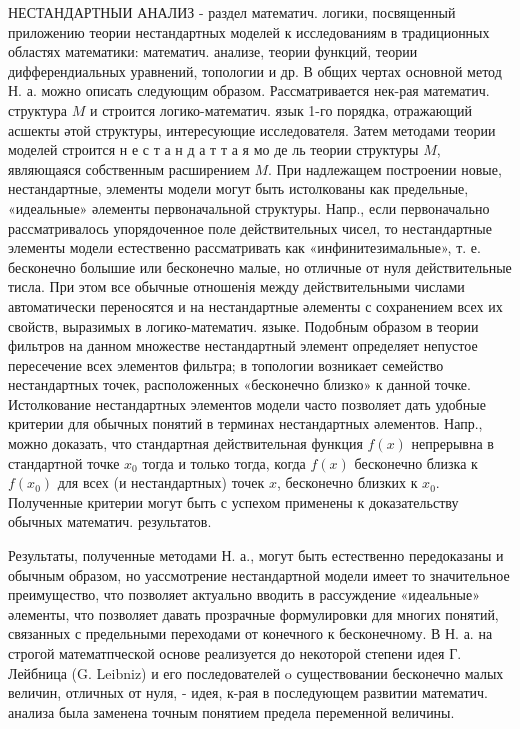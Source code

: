 \documentclass[10pt]{article}
\begin{document}
НЕСТАНДАРТНЫИ АНАЛИЗ - раздел математич. логики, посвященный приложению теории нестандартных моделей к исследованиям в традиционных областях математики: математич. анализе, теории функций, теории дифферендиальных уравнений, топологии и др. В общих чертах основной метод Н. а. можно описать следующим образом. Рассматривается нек-рая математич. структура $M$ и строится логико-математич. язык 1-го порядка, отражающий асшекты әтой структуры, интересующие исследователя. Затем методами теории моделей строится н е с т а н д а т т а я мо де ль теории структуры $M$, являющаяся собственным расширением $M$. При надлежащем построении новые, нестандартные, элементы модели могут быть истолкованы как предельные, «идеальные» әлементы первоначальной структуры. Напр., если первоначально рассматривалось упорядоченное поле действительных чисел, то нестандартные элементы модели естественно рассматривать как «инфинитезимальные», т. е. бесконечно болышие или бесконечно малые, но отличные от нуля действительные тисла. При этом все обычные отношенія между действительными числами автоматически переносятся и на нестандартные әлементы с сохранением всех их свойств, выразимых в логико-математич. языке. Подобным образом в теории фильтров на данном множестве нестандартный элемент определяет непустое пересечение всех элементов фильтра; в топологии возникает семейство нестандартных точек, расположенных «бесконечно близко» к данной точке. Истолкование нестандартных элементов модели часто позволяет дать удобные критерии для обычных понятий в терминах нестандартных әлементов. Напр., можно доказать, что стандартная действительная функция $f(x)$ непрерывна в стандартной точке $x_{0}$ тогда и только тогда, когда $f(x)$ бесконечно близка к $f\left(x_{0}\right)$ для всех (и нестандартных) точек $x$, бесконечно близких к $x_{0}$. Полученные критерии могут быть с успехом применены к доказательству обычных математич. результатов.



Результаты, полученные методами Н. а., могут быть естественно передоказаны и обычным образом, но уассмотрение нестандартной модели имеет то значительное преимущество, что позволяет актуально вводить в рассуждение «идеальные» әлементы, что позволяет давать прозрачные формулировки для многих понятий, связанных с предельными переходами от конечного к бесконечному. В Н. а. на строгой математпческой основе реализуется до некоторой степени идея Г. Лейбница (G. Leibniz) и его последователей o существовании бесконечно малых величин, отличных от нуля, - идея, к-рая в последующем развитии математич. анализа была заменена точным понятием предела переменной величины.
\end{document}
